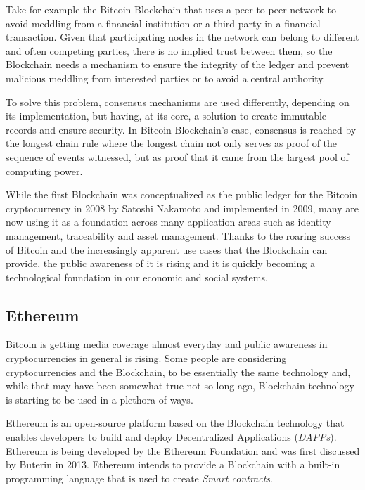   Take for example the Bitcoin Blockchain that uses a peer-to-peer network to
  avoid meddling from a financial institution or a third party in a financial
  transaction. Given that participating nodes in the network can belong to
  different and often competing parties, there is no implied trust between them,
  so the Blockchain needs a mechanism to ensure the integrity of the ledger and
  prevent malicious meddling from interested parties or to avoid a central
  authority.\cite{Barclay2017}

  To solve this problem, consensus mechanisms are used differently, depending on
  its implementation, but having, at its core, a solution to create immutable
  records and ensure security.  In Bitcoin Blockchain’s case, consensus is
  reached by the longest chain rule where the longest chain not only serves as
  proof of the sequence of events witnessed, but as proof that it came from the
  largest pool of computing power.\cite{Baars2016}

  While the first Blockchain was conceptualized as the public ledger for the
  Bitcoin cryptocurrency in 2008 by Satoshi Nakamoto and implemented in 2009,
  many are now using it as a foundation across many application areas such as
  identity management, traceability and asset management.  Thanks to the roaring
  success of Bitcoin and the increasingly apparent use cases that the Blockchain
  can provide, the public awareness of it is rising and it is quickly becoming a
  technological foundation in our economic and social systems.

  \subsection{Ethereum}

  Bitcoin is getting media coverage almost everyday and public awareness in
  cryptocurrencies in general is rising.  Some people are considering
  cryptocurrencies and the Blockchain, to be essentially the same technology and,
  while that may have been somewhat true not so long ago, Blockchain technology
  is starting to be used in a plethora of ways.

  Ethereum is an open-source platform based on the Blockchain technology that
  enables developers to build and deploy Decentralized Applications
  (\textit{DAPPs}).  Ethereum is being developed by the Ethereum Foundation and
  was first discussed by Buterin in 2013.  Ethereum intends to provide a
  Blockchain with a built-in programming language that is used to create
  \textit{Smart contracts}.  \cite{Wood2017}

